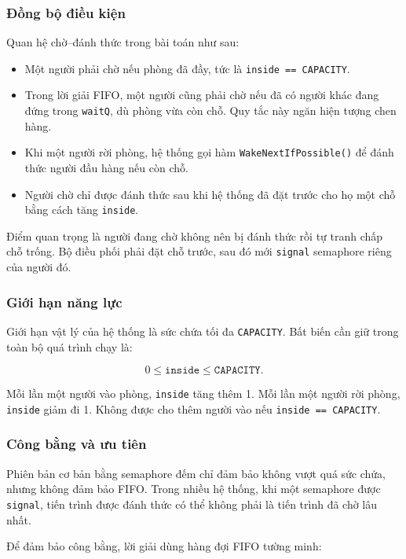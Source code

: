 \subsubsection*{Đồng bộ điều kiện}

Quan hệ chờ--đánh thức trong bài toán như sau:

\begin{itemize}
    \item Một người phải chờ nếu phòng đã đầy, tức là
    \texttt{inside == CAPACITY}.
    \item Trong lời giải FIFO, một người cũng phải chờ nếu đã có người
    khác đang đứng trong \texttt{waitQ}, dù phòng vừa còn chỗ. Quy tắc này
    ngăn hiện tượng chen hàng.
    \item Khi một người rời phòng, hệ thống gọi hàm
    \texttt{WakeNextIfPossible()} để đánh thức người đầu hàng nếu còn chỗ.
    \item Người chờ chỉ được đánh thức sau khi hệ thống đã đặt trước cho
    họ một chỗ bằng cách tăng \texttt{inside}.
\end{itemize}

Điểm quan trọng là người đang chờ không nên bị đánh thức rồi tự tranh
chấp chỗ trống. Bộ điều phối phải đặt chỗ trước, sau đó mới
\texttt{signal} semaphore riêng của người đó.

\subsubsection*{Giới hạn năng lực}

Giới hạn vật lý của hệ thống là sức chứa tối đa \texttt{CAPACITY}. Bất
biến cần giữ trong toàn bộ quá trình chạy là:

\[
    0 \leq \texttt{inside} \leq \texttt{CAPACITY}.
\]

Mỗi lần một người vào phòng, \texttt{inside} tăng thêm 1. Mỗi lần một
người rời phòng, \texttt{inside} giảm đi 1. Không được cho thêm người vào
nếu \texttt{inside == CAPACITY}.

\subsubsection*{Công bằng và ưu tiên}

Phiên bản cơ bản bằng semaphore đếm chỉ đảm bảo không vượt quá sức chứa,
nhưng không đảm bảo FIFO. Trong nhiều hệ thống, khi một semaphore được
\texttt{signal}, tiến trình được đánh thức có thể không phải là tiến
trình đã chờ lâu nhất.

Để đảm bảo công bằng, lời giải dùng hàng đợi FIFO tường minh:

